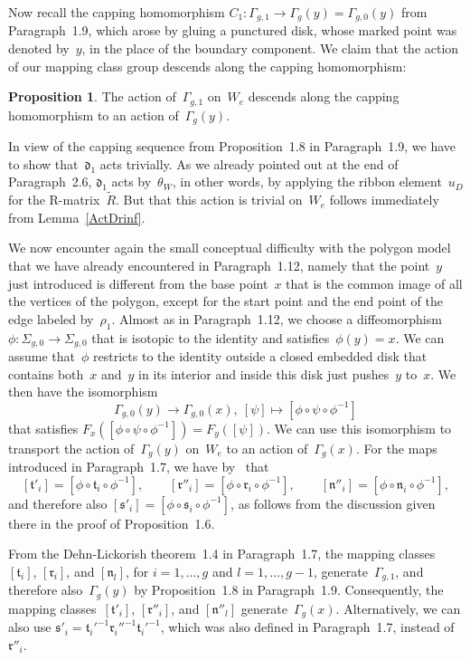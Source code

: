 \documentclass[12pt]{article}
\makeatletter
\theoremstyle{definition}
\newtheorem{Proposition}[Satz]{Proposition}
\theoremstyle{break}
\renewenvironment{proof}[1][\proofname]{\par
\vspace{-5pt}%
\pushQED{\qed}%
\normalfont
\topsep0pt \partopsep0pt %
\trivlist
\item[\hskip\labelsep
\bfseries
#1\@addpunct{.}]\ignorespaces
}{%
\popQED\endtrivlist\@endpefalse
\addvspace{6pt plus 6pt} %
}
\newcommand{\fr}{\mathfrak{r}}
\newcommand{\fs}{\mathfrak{s}}
\newcommand{\ft}{\mathfrak{t}}
\newcommand{\fn}{\mathfrak{n}}
\newcommand{\fd}{\mathfrak{d}}
\renewcommand{\1}{\mathbbm{1}}
\makeatother
\begin{document}
Now recall the capping homomorphism
$C_1 \colon \Gamma_{g,1} \to \Gamma_{g}(y) = \Gamma_{g,0}(y)$ from Paragraph~1.9, which arose by gluing a punctured disk, whose marked point was denoted by~$y$, in the place of the boundary component. We claim that the action of our mapping class group descends along the capping homomorphism:
\begin{Proposition} \label{DescCap}
The action of~$\Gamma_{g,1}$ on~$W_e$ descends along the capping homomorphism to an action of~$\Gamma_{g}(y)$.
\end{Proposition}
\begin{proof}
In view of the capping sequence from Proposition~1.8 in Paragraph~1.9, we have to show that~$\fd_1$ acts trivially. As we already pointed out at the end of Paragraph~2.6, $\fd_1$ acts by~$\theta_W$, in other words, by applying the ribbon element~$u_D$ for the R-matrix~$\tilde{R}$. But that this action is trivial on~$W_e$ follows immediately from Lemma~\ref{ActDrinf}.
\end{proof}

We now encounter again the small conceptual difficulty with the polygon model that we have already encountered in Paragraph~1.12, namely that the point~$y$ just introduced is different from the base point~$x$ that is the common image of all the vertices of the polygon, except for the start point and the end point of the edge labeled by~$\rho_1$. Almost as in Paragraph~1.12, we choose a diffeomorphism~$\phi \colon \Sigma_{g,0} \to \Sigma_{g,0}$ that is isotopic to the identity and satisfies~$\phi(y) = x$. We can assume that~$\phi$ restricts to the identity outside a closed embedded disk that contains both~$x$ and~$y$ in its interior and inside this disk just pushes~$y$ to~$x$. We then have the isomorphism
\[ \Gamma_{g,0}(y) \to \Gamma_{g,0}(x),~[\psi] \mapsto [\phi \circ \psi \circ \phi^{-1}]\]
that satisfies $F_x([\phi \circ \psi \circ \phi^{-1}]) = F_y([\psi])$. We can use this isomorphism to transport the action of~$\Gamma_{g}(y)$ on~$W_e$ to an action of~$\Gamma_{g}(x)$. For the maps introduced in Paragraph~1.7, we have by~\cite[Sec.~3.3, Fact~3.7, p.~73]{FM} that
\[[\ft'_i] = [\phi \circ \ft_i \circ \phi^{-1}], \qquad
[\fr''_i] = [\phi \circ \fr_i \circ \phi^{-1}], \qquad
[\fn''_i] = [\phi \circ \fn_i \circ \phi^{-1}],\]
and therefore also $[\fs'_i] = [\phi \circ \fs_i \circ \phi^{-1}]$, as follows from the discussion given there in the proof of Proposition~1.6.

From the Dehn-Lickorish theorem~1.4 in Paragraph~1.7, the mapping classes
$[\ft_i]$, $[\fr_i]$, and $[\fn_l]$, for $i=1,\dots,g$ and $l=1,\dots, g-1$, generate~$\Gamma_{g,1}$, and therefore also~$\Gamma_{g}(y)$ by Proposition~1.8 in Paragraph~1.9. Consequently, the mapping classes~$[\ft'_i]$, $[\fr''_i]$, and $[\fn''_l]$ generate~$\Gamma_{g}(x)$. Alternatively, we can also use $\fs'_i = \ft_i'^{-1} \fr_i''^{-1} \ft_i'^{-1}$, which was also defined in Paragraph~1.7, instead of~$\fr''_i$.
\end{document}
